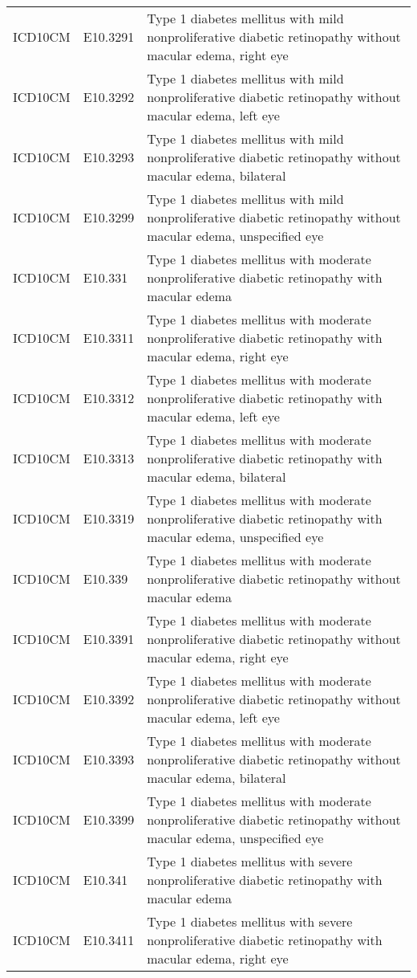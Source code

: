 \begin{longtable}{p{}p{}p{}}
  ICD10CM & E10.3291 & Type 1 diabetes mellitus with mild nonproliferative diabetic retinopathy without macular edema, right eye \\ 
  ICD10CM & E10.3292 & Type 1 diabetes mellitus with mild nonproliferative diabetic retinopathy without macular edema, left eye \\ 
  ICD10CM & E10.3293 & Type 1 diabetes mellitus with mild nonproliferative diabetic retinopathy without macular edema, bilateral \\ 
  ICD10CM & E10.3299 & Type 1 diabetes mellitus with mild nonproliferative diabetic retinopathy without macular edema, unspecified eye \\ 
  ICD10CM & E10.331 & Type 1 diabetes mellitus with moderate nonproliferative diabetic retinopathy with macular edema \\ 
  ICD10CM & E10.3311 & Type 1 diabetes mellitus with moderate nonproliferative diabetic retinopathy with macular edema, right eye \\ 
  ICD10CM & E10.3312 & Type 1 diabetes mellitus with moderate nonproliferative diabetic retinopathy with macular edema, left eye \\ 
  ICD10CM & E10.3313 & Type 1 diabetes mellitus with moderate nonproliferative diabetic retinopathy with macular edema, bilateral \\ 
  ICD10CM & E10.3319 & Type 1 diabetes mellitus with moderate nonproliferative diabetic retinopathy with macular edema, unspecified eye \\ 
  ICD10CM & E10.339 & Type 1 diabetes mellitus with moderate nonproliferative diabetic retinopathy without macular edema \\ 
  ICD10CM & E10.3391 & Type 1 diabetes mellitus with moderate nonproliferative diabetic retinopathy without macular edema, right eye \\ 
  ICD10CM & E10.3392 & Type 1 diabetes mellitus with moderate nonproliferative diabetic retinopathy without macular edema, left eye \\ 
  ICD10CM & E10.3393 & Type 1 diabetes mellitus with moderate nonproliferative diabetic retinopathy without macular edema, bilateral \\ 
  ICD10CM & E10.3399 & Type 1 diabetes mellitus with moderate nonproliferative diabetic retinopathy without macular edema, unspecified eye \\ 
  ICD10CM & E10.341 & Type 1 diabetes mellitus with severe nonproliferative diabetic retinopathy with macular edema \\ 
  ICD10CM & E10.3411 & Type 1 diabetes mellitus with severe nonproliferative diabetic retinopathy with macular edema, right eye \\ 

\end{longtable}
